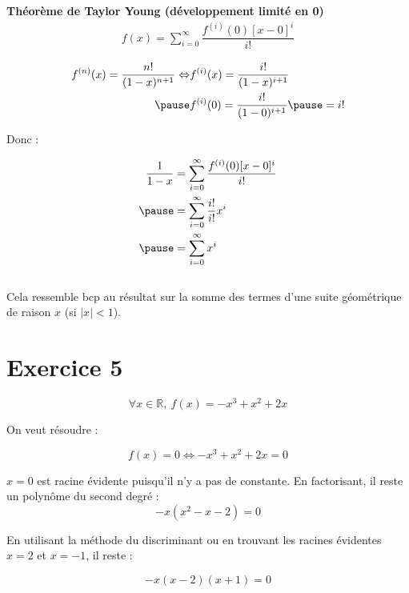 \documentclass[9pt,handout,professionalfonts,hyperref]{beamer}
\begin{document}
\begin{frame}

	\textbf{Théorème de Taylor Young (développement limité en 0)}
	\[\begin{aligned}
	f(x)=\sum_{i=0}^{\infty}\dfrac{f^{(i)}(0)[x-0]^i}{i!}
	\end{aligned}\]
	\pause


\[\begin{aligned}
f^{(n)}(x) =\dfrac{n!}{(1-x)^{n+1}} \Leftrightarrow
&f^{(i)}(x) =\dfrac{i!}{(1-x)^{i+1}}\\
\pause &f^{(i)}(0) =\dfrac{i!}{(1-0)^{i+1}} \pause = i!
\end{aligned}\]

Donc :

\[\begin{aligned}
\dfrac{1}{1-x}
&=\sum_{i=0}^{\infty}\dfrac{f^{(i)}(0)[x-0]^i}{i!}\\
\pause &=\sum_{i=0}^{\infty}\dfrac{i!}{i!}x^i \\
\pause &=\sum_{i=0}^{\infty}x^i
\end{aligned}\]\\

Cela ressemble bcp au résultat sur la somme des termes d'une suite géométrique de raison $x$ (si $|x|<1$).
\end{frame}

\section{Exercice 5}

\begin{frame}
$$
\forall x \in \mathbb{R}, ~f(x)=-x^3+x^2+2x
$$

\pause On veut résoudre :

$$f(x)=0 \Leftrightarrow -x^3+x^2+2x=0$$
\pause

$x=0$ est racine évidente puisqu'il n'y a pas de constante. \pause En factorisant, il reste un polynôme du second degré :
$$-x(x^2-x-2)=0$$

\pause En utilisant la méthode du discriminant ou en trouvant les racines évidentes $x=2$ et $x=-1$, il reste :

$$-x(x-2)(x+1)=0$$

\end{frame}
\end{document}
